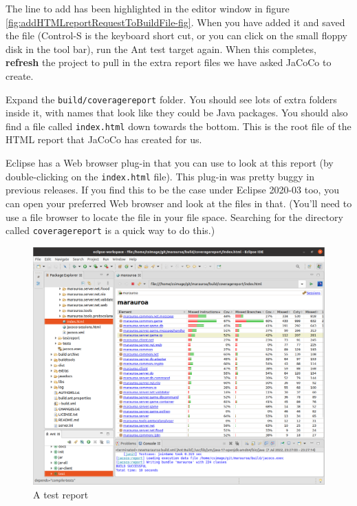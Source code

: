 \documentclass[
]{book}
\begin{document}
The line to add has been highlighted in the editor window in figure \ref{fig:addHTMLreportRequestToBuildFile-fig}. When you have added it and saved the file (Control-S is the keyboard short cut, or you can click on the small floppy disk in the tool bar), run the Ant test target again. When this completes, \textbf{refresh} the project to pull in the extra report files we have asked JaCoCo to create.

Expand the \texttt{build/coveragereport} folder. You should see lots of extra folders inside it, with names that look like they could be Java packages. You should also find a file called \texttt{index.html} down towards the bottom. This is the root file of the HTML report that JaCoCo has created for us.

Eclipse has a Web browser plug-in that you can use to look at this report (by double-clicking on the \texttt{index.html} file). This plug-in was pretty buggy in previous releases. If you find this to be the case under Eclipse 2020-03 too, you can open your preferred Web browser and look at the files in that. (You'll need to use a file browser to locate the file in your file space. Searching for the directory called \texttt{coveragereport} is a quick way to do this.)

\begin{figure}

{\centering \includegraphics[width=1\linewidth]{images/3.3.7showCoverageReport} 

}

\caption{A test report}\label{fig:showCoverageReport-fig}
\end{figure}
\end{document}
